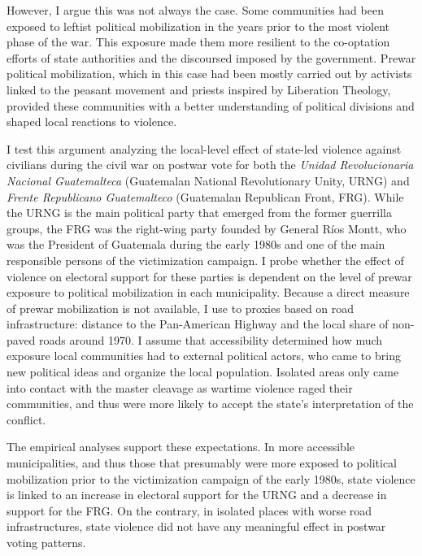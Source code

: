 \documentclass[12pt, notitlepage]{article}
\begin{document}
However, I argue this was not always the case.
Some communities had been exposed to leftist political mobilization in the years prior to the most violent phase of the war.
This exposure made them more resilient to the co-optation efforts of state authorities and the discoursed imposed by the government.
Prewar political mobilization, which in this case had been mostly carried out by activists linked to the peasant movement and priests inspired by Liberation Theology, provided these communities with a better understanding of political divisions and shaped local reactions to violence.

I test this argument analyzing the local-level effect of state-led violence against civilians during the civil war on postwar vote for both the \textit{Unidad Revolucionaria Nacional Guatemalteca} (Guatemalan National Revolutionary Unity, URNG) and \textit{Frente Republicano Guatemalteco} (Guatemalan Republican Front, FRG).
While the URNG is the main political party that emerged from the former guerrilla groups, the FRG was the right-wing party founded by General Ríos Montt, who was the President of Guatemala during the early 1980s and one of the main responsible persons of the victimization campaign.
I probe whether the effect of violence on electoral support for these parties is dependent on the level of prewar exposure to political mobilization in each municipality.
Because a direct measure of prewar mobilization is not available, I use to proxies based on road infrastructure: distance to the Pan-American Highway and the local share of non-paved roads around 1970.
I assume that accessibility determined how much exposure local communities had to external political actors, who came to bring new political ideas and organize the local population.
Isolated areas only came into contact with the master cleavage as wartime violence raged their communities, and thus were more likely to accept the state's interpretation of the conflict.

The empirical analyses support these expectations.
In more accessible municipalities, and thus those that presumably were more exposed to political mobilization prior to the victimization campaign of the early 1980s, state violence is linked to an increase in electoral support for the URNG and a decrease in support for the FRG.
On the contrary, in isolated places with worse road infrastructures, state violence did not have any meaningful effect in postwar voting patterns.
\end{document}
